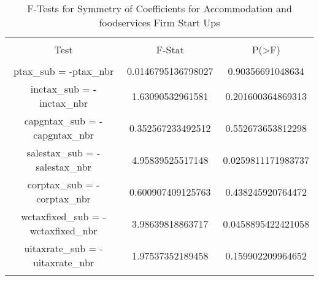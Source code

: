 
\begin{table}[!htbp] \centering 
  \caption{F-Tests for Symmetry of Coefficients for Accommodation and foodservices Firm Start Ups} 
  \label{} 
\begin{tabular}{@{\extracolsep{5pt}} ccc} 
\\[-1.8ex]\hline 
\hline \\[-1.8ex] 
Test & F-Stat & P(\textgreater F) \\ 
\hline \\[-1.8ex] 
ptax\_sub = -ptax\_nbr & 0.0146795136798027 & 0.90356691048634 \\ 
inctax\_sub = -inctax\_nbr & 1.63090532961581 & 0.201600364869313 \\ 
capgntax\_sub = -capgntax\_nbr & 0.352567233492512 & 0.552673653812298 \\ 
salestax\_sub = -salestax\_nbr & 4.95839525517148 & 0.0259811171983737 \\ 
corptax\_sub = -corptax\_nbr & 0.600907409125763 & 0.438245920764472 \\ 
wctaxfixed\_sub = -wctaxfixed\_nbr & 3.98639818863717 & 0.0458895422421058 \\ 
uitaxrate\_sub = -uitaxrate\_nbr & 1.97537352189458 & 0.159902209964652 \\ 
\hline \\[-1.8ex] 
\end{tabular} 
\end{table} 
